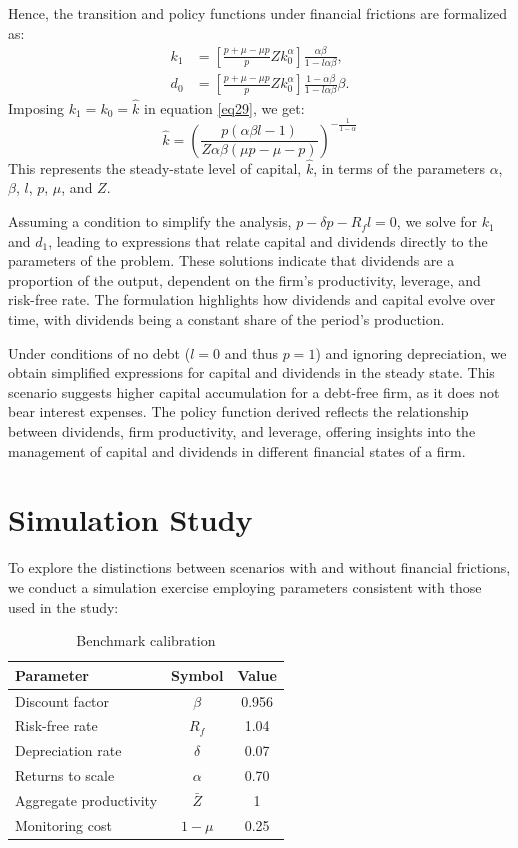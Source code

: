 \documentclass[12pt]{report}
\begin{document}
Hence, the transition and policy functions under financial frictions are formalized as:
\begin{align}
    k_1 &= \left[ \frac{p + \mu - \mu p}{p}Z k_0^{\alpha}\right] \frac{\alpha\beta}{1-l\alpha\beta}, \label{eq29} \\
    d_0 &= \left[ \frac{p + \mu - \mu p}{p}Z k_0^{\alpha}\right] \frac{1-\alpha\beta}{1-l\alpha\beta} \beta.
\end{align}
Imposing \(k_1=k_0=\hat{k}\) in equation \ref{eq29}, we get:
\begin{equation}
    \hat{k} = \left(\frac{p(\alpha \beta l - 1)}{Z \alpha \beta (\mu p - \mu - p)}\right)^{-\frac{1}{1-\alpha }}
\end{equation}
This represents the steady-state level of capital, \(\hat{k}\), in terms of the parameters \(\alpha\), \(\beta\), \(l\),
\(p\), \(\mu\), and \(Z\). 

 Assuming a condition to simplify the analysis, \(p - \delta p - R_f l=0\), we solve for \(k_1\) and \(d_1\), leading to
 expressions that relate capital and dividends directly to the parameters of the problem. These solutions indicate that
 dividends are a proportion of the output, dependent on the firm's productivity, leverage, and risk-free rate. The
 formulation highlights how dividends and capital evolve over time,  with dividends being a constant share of the
 period's production.

 Under conditions of no debt (\(l=0\) and thus \(p=1\)) and ignoring depreciation, we obtain simplified expressions for
 capital and dividends in the steady state. This scenario suggests higher capital accumulation for a debt-free firm, as
 it does not bear interest expenses. The policy function derived reflects the relationship between dividends, firm
 productivity, and leverage, offering insights into the management of capital and dividends in different financial
 states of a firm.

 
\section{Simulation Study}

To explore the distinctions between scenarios with and without financial frictions, we conduct a simulation exercise
employing  parameters consistent with those used in the \cite{OsePap17} study:

\begin{table}[H]
    \centering
    \begin{tabular}{lcc}
    \hline Parameter & Symbol & Value \\
    \hline \hline
    Discount factor & $\beta$ & 0.956 \\
    Risk-free rate & $R_f$ & 1.04 \\
    Depreciation rate & $\delta$ & 0.07 \\
    Returns to scale & $\alpha$ & 0.70 \\
    Aggregate productivity & $\bar{Z}$ & 1 \\
    Monitoring cost & $1-\mu$ & 0.25 \\
    \hline
    \end{tabular}
    \caption{Benchmark calibration}
\end{table}
\end{document}
